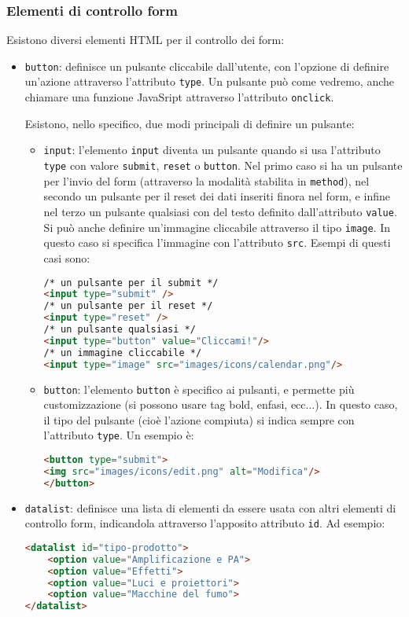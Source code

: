 \documentclass[a4paper,11pt]{article}
\begin{document}
\subsubsection{Elementi di controllo form}
Esistono diversi elementi HTML per il controllo dei form:
\begin{itemize}
	\item \lstinline|button|: definisce un pulsante cliccabile dall'utente, con l'opzione di definire un'azione attraverso l'attributo \lstinline|type|.
	Un pulsante può come vedremo, anche chiamare una funzione JavaSript attraverso l'attributo \lstinline|onclick|.
		
	Esistono, nello specifico, due modi principali di definire un pulsante:
	\begin{itemize}
		\item \lstinline|input|: l'elemento \lstinline|input| diventa un pulsante quando si usa l'attributo \lstinline|type| con valore \lstinline|submit|, \lstinline|reset| o \lstinline|button|. Nel primo caso si ha un pulsante per l'invio del form (attraverso la modalità stabilita in \lstinline|method|), nel secondo un pulsante per il reset dei dati inseriti finora nel form, e infine nel terzo un pulsante qualsiasi con del testo definito dall'attributo \lstinline|value|.
		Si può anche definire un'immagine cliccabile attraverso il tipo \lstinline|image|.
		In questo caso si specifica l'immagine con l'attributo \lstinline|src|.
		Esempi di questi casi sono:
\begin{lstlisting}[language=html, style=codestyle]	
/* un pulsante per il submit */
<input type="submit" /> 
/* un pulsante per il reset */
<input type="reset" /> 
/* un pulsante qualsiasi */
<input type="button" value="Cliccami!"/>
/* un immagine cliccabile */
<input type="image" src="images/icons/calendar.png"/>
\end{lstlisting}
		\item \lstinline|button|: l'elemento \lstinline|button| è specifico ai pulsanti, e permette più customizzazione (si possono usare tag bold, enfasi, ecc...). In questo caso, il tipo del pulsante (cioè l'azione compiuta) si indica sempre con l'attributo \lstinline|type|.
		Un esempio è:
\begin{lstlisting}[language=html, style=codestyle]	
<button type="submit">
<img src="images/icons/edit.png" alt="Modifica"/>
</button>
\end{lstlisting}
	\end{itemize}

\item \lstinline|datalist|: definisce una lista di elementi da essere usata con altri elementi di controllo form, indicandola attraverso l'apposito attributo \lstinline|id|. Ad esempio:
\begin{lstlisting}[language=html, style=codestyle]	
<datalist id="tipo-prodotto">
	<option value="Amplificazione e PA">
	<option value="Effetti">
	<option value="Luci e proiettori">
	<option value="Macchine del fumo">
</datalist>
\end{lstlisting}
	

\end{itemize}
\end{document}
